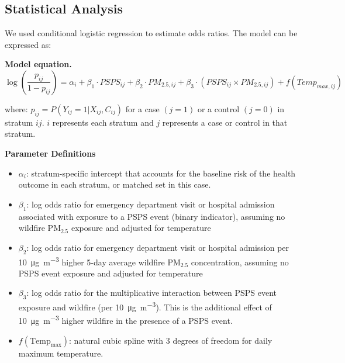 \documentclass[../main.tex]{subfiles}
\begin{document}


\subsection{Statistical Analysis}
We used conditional logistic regression to estimate odds ratios. The model can be expressed as:

\textbf{Model equation.}
\begin{equation}
\label{eq:model}
\log\left(\frac{p_{ij}}{1-p_{ij}}\right) = \alpha_i + \beta_1 \cdot PSPS_{ij} + \beta_2 \cdot PM_{2.5,ij} + \beta_3 \cdot (PSPS_{ij} \times PM_{2.5,ij}) + f(Temp_{max,ij})
\end{equation}

where: $p_{ij} = P(Y_{ij} = 1 | X_{ij}, C_{ij})$ for a case $(j = 1)$ or a control $(j = 0)$ in stratum $ij$. $i$ represents each stratum and $j$ represents a case or control in that stratum.

\vspace{1em}

\textbf{Parameter Definitions}
\begin{itemize}
\item $\alpha_i$: stratum-specific intercept that accounts for the baseline risk of the health outcome in each stratum, or matched set in this case. 
\item $\beta_1$: log odds ratio for emergency department visit or hospital admission associated with exposure to a PSPS event (binary indicator), assuming no wildfire PM$_{2.5}$ exposure and adjusted for temperature
\item $\beta_2$: log odds ratio for emergency department visit or hospital admission per \SI[per-mode=symbol]{10}{\micro\gram\per\cubic\metre} higher 5-day average wildfire PM$_{2.5}$ concentration, assuming no PSPS event exposure and adjusted for temperature
\item $\beta_3$: log odds ratio for the multiplicative interaction between PSPS event exposure and wildfire \PM (per \SI[per-mode=symbol]{10}{\micro\gram\per\cubic\metre}). This is the additional effect of \SI[per-mode=symbol]{10}{\micro\gram\per\cubic\metre} higher wildfire \PM in the presence of a PSPS event. 
\item $f(\mathrm{Temp_{max}})$: natural cubic spline with 3 degrees of freedom for daily maximum temperature.
\end{itemize}
\end{document}
